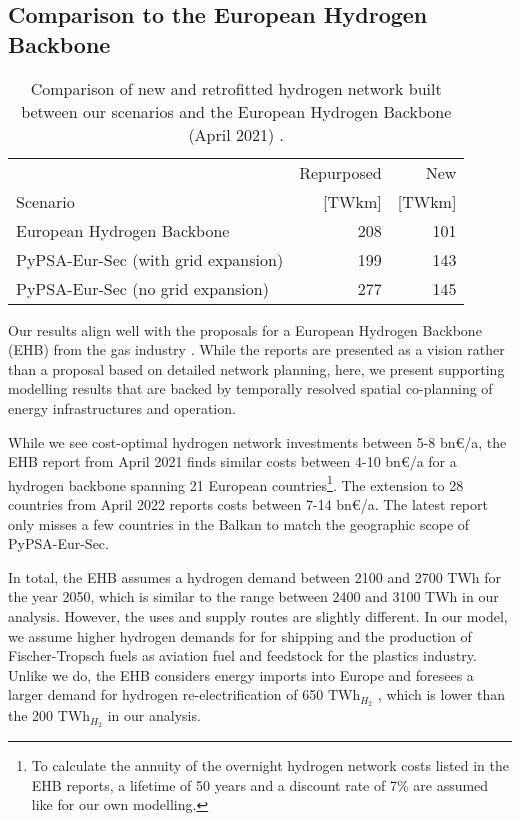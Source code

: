 \subsection*{Comparison to the European Hydrogen Backbone}

\begin{table}
  \caption{Comparison of new and retrofitted hydrogen network built between our scenarios and the European Hydrogen Backbone (April 2021) \cite{gasforclimateExtendingEuropean2021}.}
  \label{tab:ehb}
  \centering
  \begin{tabular}{lrr}
      \toprule
       & Repurposed & New \\
       Scenario& [TWkm] & [TWkm] \\
      \midrule
      European Hydrogen Backbone \cite{gasforclimateExtendingEuropean2021} & 208 & 101 \\
      PyPSA-Eur-Sec (with grid expansion) & 199 & 143  \\
      PyPSA-Eur-Sec (no grid expansion) & 277 & 145 \\
      \bottomrule
    \end{tabular}
\end{table}

Our results align well with the proposals for a European Hydrogen Backbone (EHB)
from the gas industry
\cite{gasforclimateEuropeanHydrogen2020,gasforclimateExtendingEuropean2021,gasforclimateEuropeanHydrogen2021,gasforclimateEuropeanHydrogen2022}.
While the reports are presented as a vision rather than a proposal based on
detailed network planning, here, we present supporting modelling results that
are backed by temporally resolved spatial co-planning of energy infrastructures
and operation.

While we see cost-optimal hydrogen network investments between 5-8 bn\euro/a,
the EHB report from April 2021 \cite{gasforclimateExtendingEuropean2021} finds
similar costs between 4-10 bn\euro/a for a hydrogen backbone spanning 21
European countries\footnote{To calculate the annuity of the overnight hydrogen
network costs listed in the EHB reports, a lifetime of 50 years and a discount
rate of 7\% are assumed like for our own modelling.}. The extension to 28
countries from April 2022 \cite{gasforclimateEuropeanHydrogen2022} reports costs
between 7-14 bn\euro/a. The latest report only misses a few countries in the
Balkan to match the geographic scope of PyPSA-Eur-Sec.

In total, the EHB \cite{gasforclimateEuropeanHydrogen2021} assumes a hydrogen
demand between 2100 and 2700 TWh for the year 2050, which is similar to the
range between 2400 and 3100 TWh in our analysis. However, the uses and supply
routes are slightly different. In our model, we assume higher hydrogen demands
for for shipping and the production of Fischer-Tropsch fuels as aviation fuel
and feedstock for the plastics industry. Unlike we do, the EHB considers energy
imports into Europe and foresees a larger demand for hydrogen re-electrification
of 650 TWh$_{H_2}$ \cite{gasforclimateEuropeanHydrogen2021}, which is lower than
the 200 TWh$_{H_2}$ in our analysis.

